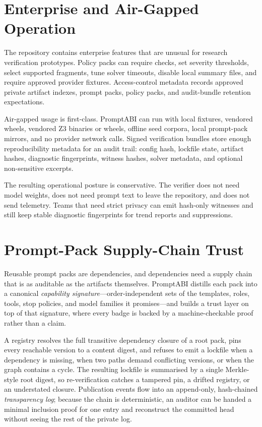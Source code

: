\documentclass[10pt]{article}
\begin{document}
\newpage
\section{Enterprise and Air-Gapped Operation}

The repository contains enterprise features that are unusual for research
verification prototypes. Policy packs can require checks, set severity
thresholds, select supported fragments, tune solver timeouts, disable local
summary files, and require approved provider fixtures. Access-control metadata
records approved private artifact indexes, prompt packs, policy packs, and
audit-bundle retention expectations.

Air-gapped usage is first-class. PromptABI can run with local fixtures,
vendored wheels, vendored Z3 binaries or wheels, offline seed corpora, local
prompt-pack mirrors, and no provider network calls. Signed verification bundles
store enough reproducibility metadata for an audit trail: config hash, lockfile
state, artifact hashes, diagnostic fingerprints, witness hashes, solver
metadata, and optional non-sensitive excerpts.

The resulting operational posture is conservative. The verifier does not need
model weights, does not need prompt text to leave the repository, and does not
send telemetry. Teams that need strict privacy can emit hash-only witnesses and
still keep stable diagnostic fingerprints for trend reports and suppressions.

\newpage
\section{Prompt-Pack Supply-Chain Trust}
\label{sec:supplychain-anchor}

Reusable prompt packs are dependencies, and dependencies need a supply chain that
is as auditable as the artifacts themselves. PromptABI distills each pack into a
canonical \emph{capability signature}---order-independent sets of the templates,
roles, tools, stop policies, and model families it promises---and builds a
trust layer on top of that signature, where every badge is backed by a
machine-checkable proof rather than a claim.

A registry resolves the full transitive dependency closure of a root pack,
pins every reachable version to a content digest, and refuses to emit a lockfile
when a dependency is missing, when two paths demand conflicting versions, or
when the graph contains a cycle. The resulting lockfile is summarised by a single
Merkle-style root digest, so re-verification catches a tampered pin, a drifted
registry, or an understated closure. Publication events flow into an append-only,
hash-chained \emph{transparency log}; because the chain is deterministic, an
auditor can be handed a minimal inclusion proof for one entry and reconstruct the
committed head without seeing the rest of the private log.
\end{document}
